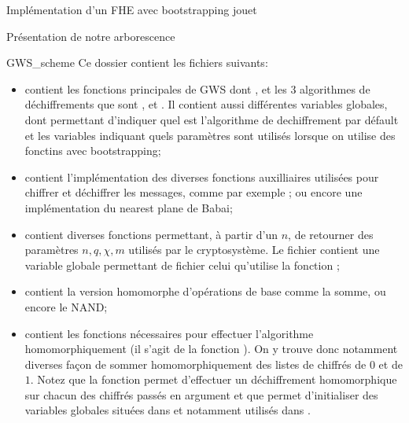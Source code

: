 \begin{section}{Implémentation d'un FHE avec bootstrapping \og{} jouet\fg{}}
\begin{subsection}{Présentation de notre arborescence}
\begin{subsubsection}{GWS\_scheme}
Ce dossier contient les fichiers suivants:
\begin{itemize}
\item {} contient les fonctions principales de GWS
dont ,  et les 3 algorithmes de
déchiffrements que sont , 
et . Il contient aussi différentes variables
globales, dont  permettant d'indiquer quel est
l'algorithme de dechiffrement par défault et les variables 
 indiquant quels paramètres sont utilisés lorsque 
on utilise des fonctins avec bootstrapping;
\item {} contient l'implémentation 
	des diverses fonctions auxilliaires utilisées pour chiffrer 
	et déchiffrer les messages, comme par exemple ;
	ou encore une implémentation du nearest plane de Babai;
\item {} contient diverses fonctions permettant, à 
	partir d'un $n$, de retourner des paramètres $n, q, \chi, m$
	utilisés par le cryptosystème. Le fichier 
	contient une variable globale 
	permettant de fichier celui qu'utilise la fonction
	;
\item {} contient la version homomorphe
	d'opérations de base comme la somme, ou encore le NAND;
\item {} contient les fonctions nécessaires pour
	effectuer l'algorithme  homomorphiquement
	(il s'agit de la fonction ). On y trouve
	donc notamment diverses façon de sommer homomorphiquement
	des listes de chiffrés de $0$ et de $1$. Notez que la fonction
	 permet d'effectuer un déchiffrement 
	homomorphique sur chacun des chiffrés
	passés en argument et que  permet d'initialiser 
	des variables globales 
	situées dans  et notamment utilisés dans
	.
\end{itemize}
\end{subsubsection} %


\end{subsection}
\end{section}
